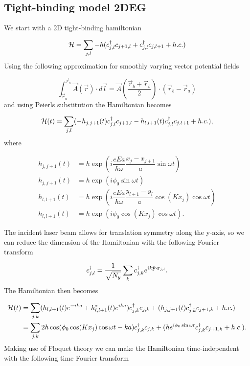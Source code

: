 \subsection{Tight-binding model 2DEG}

We start with a 2D tight-binding hamiltonian

\begin{equation}
  \mathcal{H} = \sum_{j,l} -h (c^{\dagger}_{j,l} c_{j+1,l} + c^{\dagger}_{j,l} c_{j,l+1} + h.c.)
\end{equation}
Using the following approximation for smoothly varying vector potential fields

\begin{equation}
  \int_{\vec{r}_a}^{\vec{r}_b} \vec{A}(\vec{r}) \cdot d\vec{l} = \vec{A} \left( \dfrac{\vec{r}_b+\vec{r}_b}{2} \right) \cdot (\vec{r}_b - \vec{r}_a)
\end{equation}
and using Peierls substitution the Hamiltonian becomes

\begin{equation}
  \mathcal{H}(t) = \sum_{j,l} (-h_{j,j+1}(t) c^{\dagger}_{j,l} c_{j+1,l} - h_{l,l+1}(t) c^{\dagger}_{j,l} c_{j,l+1} + h.c.),
\end{equation}
where

\begin{align}
  h_{j,j+1}(t) &= h \exp\left(i \dfrac{eEa}{\hbar \omega} \dfrac{x_j-x_{j+1}}{a} \sin \omega t\right) \nonumber \\
  h_{j,j+1}(t) &= h \exp\left(i \phi_0 \sin \omega t\right) \\
  h_{l,l+1}(t) &= h \exp\left(i \dfrac{eEa}{\hbar \omega} \dfrac{y_{l+1}-y_l}{a} \cos(Kx_j)\cos \omega t\right) \nonumber \\
  h_{l,l+1}(t) &= h \exp\left(i \phi_0 \cos(Kx_j)\cos \omega t\right).
\end{align}

The incident laser beam allows for translation symmetry along the y-axis, so we can reduce the dimension of the Hamiltonian with the following Fourier transform

\begin{equation}
  \cc_{j,l} = \dfrac{1}{\sqrt{N_y}} \sum_k \cc_{j,k} e^{ik\hat{y}\cdot \vec{r}_{j,l}}.
\end{equation}
The Hamiltonian then becomes

\begin{align}
  \mathcal{H}(t) &= \sum_{j,k} ( h_{l,l+1}(t) e^{-ika} + h_{l,l+1}^*(t) e^{ika}) c^{\dagger}_{j,k} c_{j,k} + (h_{j,j+1}(t) c^{\dagger}_{j,k} c_{j+1,k} + h.c.) \\
  &= \sum_{j,k} 2h\cos( \phi_0 \cos(Kx_j) \cos \omega t - ka ) c^{\dagger}_{j,k} c_{j,k} + (h e^{i\phi_0 \sin \omega t} c^{\dagger}_{j,k} c_{j+1,k} + h.c.).
\end{align}
Making use of Floquet theory we can make the Hamiltonian time-independent with the following time Fourier transform

